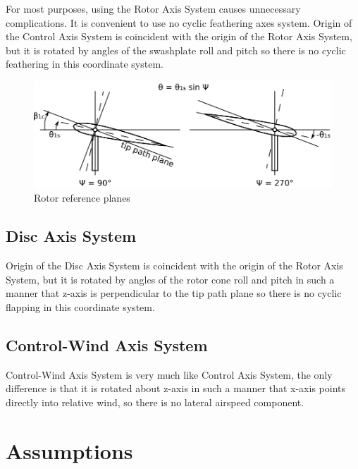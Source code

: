 For most purposes, using the Rotor Axis System causes unnecessary complications. It is convenient to use no cyclic feathering axes system. \cite{GessowMyers1985} Origin of the Control Axis System is coincident with the origin of the Rotor Axis System, but it is rotated by angles of the swashplate roll and pitch so there is no cyclic feathering in this coordinate system.

\begin{figure}[h!]
  \centering
  \includegraphics[width=120mm]{eps/rotor_planes.eps}
  \caption{Rotor reference planes}
\end{figure}

\subsection{Disc Axis System}

Origin of the Disc Axis System is coincident with the origin of the Rotor Axis System, but it is rotated by angles of the rotor cone roll and pitch in such a manner that z-axis is perpendicular to the tip path plane so there is no cyclic flapping in this coordinate system.

\subsection{Control-Wind Axis System}

Control-Wind Axis System is very much like Control Axis System, the only difference is that it is rotated about z-axis in such a manner that x-axis points directly into relative wind, so there is no lateral airspeed component.


\section{Assumptions}


